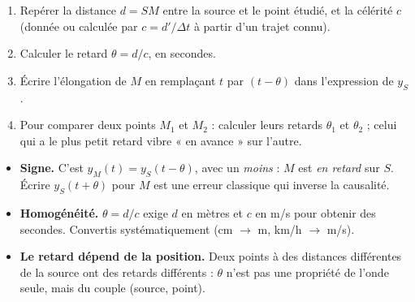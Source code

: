 \documentclass[11pt]{article}
\begin{document}
\begin{methode}[Exploiter la relation $y_M(t) = y_S(t - \theta)$]
\begin{enumerate}
\item Repérer la distance $d = SM$ entre la source et le point étudié, et la célérité $c$ (donnée ou calculée par $c = d'/\Delta t$ à partir d'un trajet connu).
\item Calculer le retard $\theta = d/c$, en secondes.
\item Écrire l'élongation de $M$ en remplaçant $t$ par $(t - \theta)$ dans l'expression de $y_S$.
\item Pour comparer deux points $M_1$ et $M_2$ : calculer leurs retards $\theta_1$ et $\theta_2$ ; celui qui a le plus petit retard vibre « en avance » sur l'autre.
\end{enumerate}
\end{methode}

\begin{attention}
\begin{itemize}
\item \textbf{Signe.} C'est $y_M(t) = y_S(t - \theta)$, avec un \emph{moins} : $M$ est \emph{en retard} sur $S$. Écrire $y_S(t+\theta)$ pour $M$ est une erreur classique qui inverse la causalité.
\item \textbf{Homogénéité.} $\theta = d/c$ exige $d$ en mètres et $c$ en \si{m/s} pour obtenir des secondes. Convertis systématiquement (cm $\to$ m, km/h $\to$ m/s).
\item \textbf{Le retard dépend de la position.} Deux points à des distances différentes de la source ont des retards différents : $\theta$ n'est pas une propriété de l'onde seule, mais du couple (source, point).
\end{itemize}
\end{attention}
\end{document}
